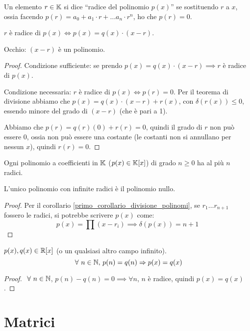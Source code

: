 Un elemento $r \in \mathbb{K}$ si dice ``radice del polinomio $p(x)$'' se sostituendo $r$ a $x$, ossia facendo $p(r) = a_0 + a_1 \cdot r + \dots a_n \cdot r^n$, ho che $p(r) = 0$.

\begin{cor}
$r$ \`e radice di $p(x) \iff p(x) = q(x) \cdot (x - r)$.

Occhio: $(x - r)$ \`e un polinomio.
\end{cor}
\begin{proof}
Condizione sufficiente: se prendo $p(x) = q(x) \cdot (x - r) \implies r$ \`e radice di $p(x)$.

Condizione necessaria: $r$ \`e radice di $p(x) \iff p(r) = 0$. Per il teorema di divisione abbiamo che $p(x) = q(x) \cdot (x - r) + r(x)$, con $\delta(r(x)) \le 0$, essendo minore del grado di $(x - r)$ (che \`e pari a 1).

Abbiamo che $p(r) = q(r) (0) + r(r) = 0$, quindi il grado di $r$ non pu\`o essere 0, ossia non pu\`o essere una costante (le costanti non si annullano per nessun $x$), quindi $r(r) = 0$.
\end{proof}
\begin{cor}
Ogni polinomio a coefficienti in $\mathbb{K}$ ($p(x) \in \mathbb{K}[x]$) di grado $n \ge 0$ ha al pi\`u $n$ radici.

L'unico polinomio con infinite radici \`e il polinomio nullo.
\end{cor}
\begin{proof}
Per il corollario \ref{primo_corollario_divisione_polinomi}, se $r_1 \dots r_{n+1}$ fossero le radici, si potrebbe scrivere $p(x)$ come:
\[
p(x) = \prod (x - r_i) \implies \delta(p(x)) = n + 1
\]
\end{proof}

\begin{theorem}
$p(x), q(x) \in \mathbb{R}[x]$ (o un qualsiasi altro campo infinito).
\[
\forall n \in \naturals , \, p(n) = q(n) \implies p(x) = q(x)
\]
\end{theorem}
\begin{proof}
$\forall n \in \naturals$, $ p(n) - q(n) = 0 \implies \forall n$, $n$ \`e radice, quindi $p(x) = q(x)$.
\end{proof}

\section{Matrici}


